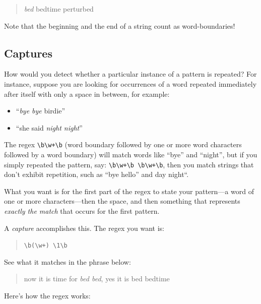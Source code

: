 \documentclass[]{book}
\providecommand{\tightlist}{%
  \setlength{\itemsep}{0pt}\setlength{\parskip}{0pt}}
\theoremstyle{definition}
\theoremstyle{definition}
\theoremstyle{remark}
\begin{document}
{\begin{quote}
\emph{bed} bedtime perturbed
\end{quote}

Note that the beginning and the end of a string count as
word-boundaries!

\subsection{Captures}\label{regex-captures}

 How would you detect whether a particular instance of a
pattern is repeated? For instance, suppose you are looking for
occurrences of a word repeated immediately after itself with only a
space in between, for example:

\begin{itemize}
\tightlist
\item
  ``\emph{bye bye} birdie''
\item
  ``she said \emph{night night}''
\end{itemize}

The regex \texttt{\textbackslash{}b\textbackslash{}w+\textbackslash{}b}
(word boundary followed by one or more word characters followed by a
word boundary) will match words like ``bye'' and ``night'', but if you
simply repeated the pattern, say:
\texttt{\textbackslash{}b\textbackslash{}w+\textbackslash{}b\ \textbackslash{}b\textbackslash{}w+\textbackslash{}b},
then you match strings that don't exhibit repetition, such as ``bye
hello'' and day night``.

What you want is for the first part of the regex to state your
pattern---a word of one or more characters---then the space, and then
something that represents \emph{exactly the match} that occurs for the
first pattern.

A \emph{capture} accomplishes this. The regex you want is:

\begin{quote}
\texttt{\textbackslash{}b(\textbackslash{}w+)\ \textbackslash{}1\textbackslash{}b}
\end{quote}

See what it matches in the phrase below:

\begin{quote}
now it is time for \emph{bed bed}, yes it is bed bedtime
\end{quote}

Here's how the regex works:

}
\end{document}
